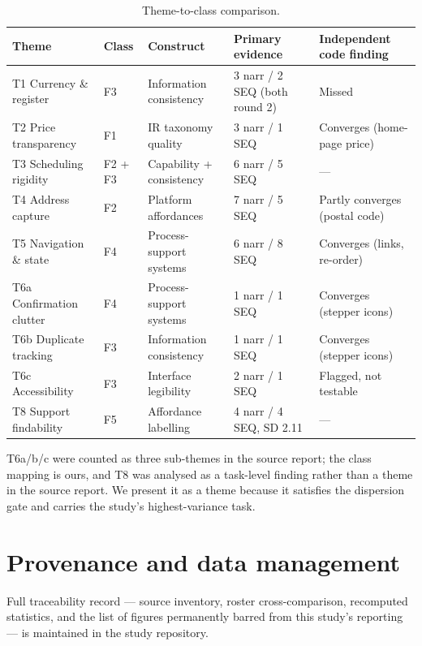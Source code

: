 \documentclass[]{interact}
\theoremstyle{plain}
\begin{document}
\begin{table}[htbp]
\caption{Theme-to-class comparison.}
{\footnotesize
\begin{tabular}{@{}p{} p{} p{} p{} p{}@{}}
\toprule
\textbf{Theme} & \textbf{Class} & \textbf{Construct} & \textbf{Primary evidence} & \textbf{Independent code finding} \\
\midrule
T1 Currency \& register & F3 & Information consistency & 3 narr / 2 SEQ (both round 2) & Missed \\
T2 Price transparency & F1 & IR taxonomy quality & 3 narr / 1 SEQ & Converges (home-page price) \\
T3 Scheduling rigidity & F2 + F3 & Capability + consistency & 6 narr / 5 SEQ & --- \\
T4 Address capture & F2 & Platform affordances & 7 narr / 5 SEQ & Partly converges (postal code) \\
T5 Navigation \& state & F4 & Process-support systems & 6 narr / 8 SEQ & Converges (links, re-order) \\
T6a Confirmation clutter & F4 & Process-support systems & 1 narr / 1 SEQ & Converges (stepper icons) \\
T6b Duplicate tracking & F3 & Information consistency & 1 narr / 1 SEQ & Converges (stepper icons) \\
T6c Accessibility & F3 & Interface legibility & 2 narr / 1 SEQ & Flagged, not testable \\
T8 Support findability & F5 & Affordance labelling & 4 narr / 4 SEQ, SD 2.11 & --- \\
\bottomrule
\end{tabular}}
\end{table}

\noindent T6a/b/c were counted as three sub-themes in the source report; the class mapping is ours, and
T8 was analysed as a task-level finding rather than a theme in the source report. We present it as a
theme because it satisfies the dispersion gate and carries the study's highest-variance task.

\section{Provenance and data management}
\label{app:prov}

Full traceability record --- source inventory, roster cross-comparison, recomputed statistics, and the
list of figures permanently barred from this study's reporting --- is maintained in the study
repository.
\end{document}

